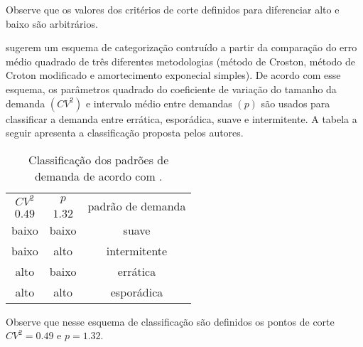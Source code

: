 \documentclass{book}
\begin{document}
Observe que os valores dos critérios de corte definidos para diferenciar alto e baixo são arbitrários.

\cite{SyntetosEtAl2005} sugerem um esquema de categorização contruído a partir da comparação do erro médio quadrado de três diferentes metodologias (método de Croston, método de Croton modificado e amortecimento exponecial simples). De acordo com esse esquema, os parâmetros quadrado do coeficiente de variação do tamanho da demanda $(CV^2)$ e intervalo médio entre demandas $(p)$ são usados para classificar a demanda entre errática, esporádica, suave e intermitente. A tabela a seguir apresenta a classificação proposta pelos autores.

\begin{table}[h]
\begin{center}
\begin{tabular}[c]{c c c}
\cline {1-3}
$CV^2$ & $p$ & \multirow{2}{*}{padrão de demanda} \\ 
$0.49$ & $1.32$ & \\ \cline {1-3}
baixo & baixo & suave   \\ 
baixo & alto  & intermitente   \\ 
alto  & baixo & errática   \\
alto  & alto  & esporádica  \\ \cline {1-3}
\end{tabular}
\label{tab:DemandPatternSybtetos}
\caption{Classificação dos padrões de demanda de acordo com \cite{SyntetosEtAl2005}.}
\end{center}
\end{table}

Observe que nesse esquema de classificação são definidos os pontos de corte $CV^2=0.49$ e $p=1.32$.

%
%
\end{document}
